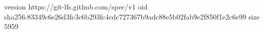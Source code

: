 version https://git-lfs.github.com/spec/v1
oid sha256:83349c6e26d3fc3c6b293fc4cdc727367b9adc88e5b02fab9e2f850f1e2c6e99
size 5959
